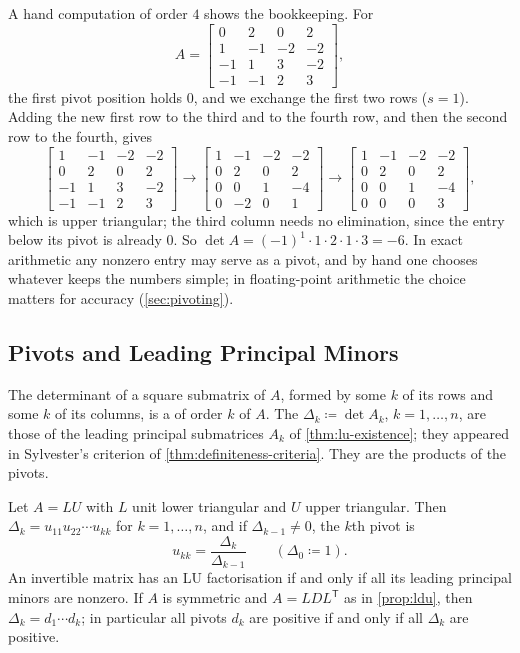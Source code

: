 A hand computation of order $4$ shows the bookkeeping. For
\[
A=\begin{bmatrix}0&2&0&2\\1&-1&-2&-2\\-1&1&3&-2\\-1&-1&2&3\end{bmatrix},
\]
the first pivot position holds $0$, and we exchange the first two rows ($s=1$). Adding the new first row to the third and to the fourth row, and then the second row to the fourth, gives
\[
\begin{bmatrix}1&-1&-2&-2\\0&2&0&2\\-1&1&3&-2\\-1&-1&2&3\end{bmatrix}\longrightarrow\begin{bmatrix}1&-1&-2&-2\\0&2&0&2\\0&0&1&-4\\0&-2&0&1\end{bmatrix}\longrightarrow\begin{bmatrix}1&-1&-2&-2\\0&2&0&2\\0&0&1&-4\\0&0&0&3\end{bmatrix},
\]
which is upper triangular; the third column needs no elimination, since the entry below its pivot is already $0$. So $\det A=(-1)^1\cdot1\cdot2\cdot1\cdot3=-6$. In exact arithmetic any nonzero entry may serve as a pivot, and by hand one chooses whatever keeps the numbers simple; in floating-point arithmetic the choice matters for accuracy (\cref{sec:pivoting}).

\subsection{Pivots and Leading Principal Minors}

The determinant of a square submatrix of $A$, formed by some $k$ of its rows and some $k$ of its columns, is a  of order $k$ of $A$. The  $\Delta_k\coloneqq\det A_k$, $k=1,\ldots,n$, are those of the leading principal submatrices $A_k$ of \cref{thm:lu-existence}; they appeared in Sylvester's criterion of \cref{thm:definiteness-criteria}. They are the products of the pivots.

\begin{proposition}
\label{prop:pivots-minors}
Let $A=LU$ with $L$ unit lower triangular and $U$ upper triangular. Then $\Delta_k=u_{11}u_{22}\cdots u_{kk}$ for $k=1,\ldots,n$, and if $\Delta_{k-1}\ne0$, the $k$th pivot is
\[
u_{kk}=\frac{\Delta_k}{\Delta_{k-1}}\qquad(\Delta_0\coloneqq1).
\]
An invertible matrix has an LU factorisation if and only if all its leading principal minors are nonzero. If $A$ is symmetric and $A=LDL^{\mathsf T}$ as in \cref{prop:ldu}, then $\Delta_k=d_1\cdots d_k$; in particular all pivots $d_k$ are positive if and only if all $\Delta_k$ are positive.
\end{proposition}

